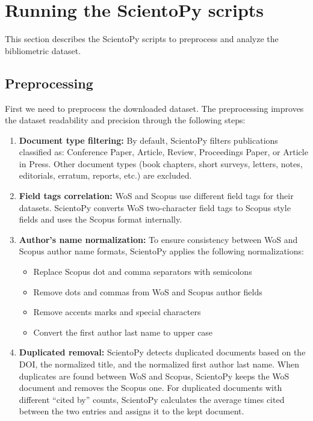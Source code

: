 \documentclass[10pt,letterpaper]{article}
\begin{document}
\section{Running the ScientoPy scripts}

This section describes the ScientoPy scripts to preprocess and analyze the bibliometric dataset. 

\subsection{Preprocessing}

First we need to preprocess the downloaded dataset. The preprocessing improves the dataset readability and precision through the following steps:

\begin{enumerate}
\item \textbf{Document type filtering:} By default, ScientoPy filters publications classified as: Conference Paper, Article, Review, Proceedings Paper, or Article in Press. Other document types (book chapters, short surveys, letters, notes, editorials, erratum, reports, etc.) are excluded.

\item \textbf{Field tags correlation:} WoS and Scopus use different field tags for their datasets. ScientoPy converts WoS two-character field tags to Scopus style fields and uses the Scopus format internally.

\item \textbf{Author's name normalization:} To ensure consistency between WoS and Scopus author name formats, ScientoPy applies the following normalizations:
\begin{itemize}
\item Replace Scopus dot and comma separators with semicolons
\item Remove dots and commas from WoS and Scopus author fields
\item Remove accents marks and special characters
\item Convert the first author last name to upper case
\end{itemize}

\item \textbf{Duplicated removal:} ScientoPy detects duplicated documents based on the DOI, the normalized title, and the normalized first author last name. When duplicates are found between WoS and Scopus, ScientoPy keeps the WoS document and removes the Scopus one. For duplicated documents with different ``cited by'' counts, ScientoPy calculates the average times cited between the two entries and assigns it to the kept document.


\end{enumerate}
\end{document}
